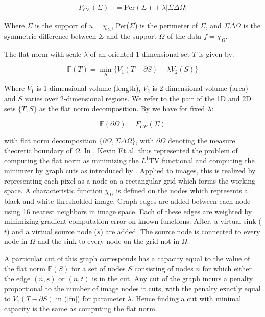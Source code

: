 \documentclass[12pt]{article}
\begin{document}
\begin{align*}
F_{CE}(\Sigma) &= \text{Per}(\Sigma) + \lambda|\Sigma \Delta \Omega|
\end{align*}

Where $\Sigma$ is the support of $u = \chi_\Sigma$, Per($\Sigma$) is the perimeter of $\Sigma$, and $\Sigma \Delta \Omega$ is the symmetric difference between $\Sigma$ and the support $\Omega$ of the data $f = \chi_\Omega$. 

The flat norm with scale $\lambda$ of an oriented $1$-dimensional set $T$ is given by:

\begin{equation} \label{fn}
\mathbb{F}(T) = \min_S \{V_1(T-\partial S) + \lambda V_2(S)\}
\end{equation}

Where $V_1$ is 1-dimensional volume (length), $V_2$ is 2-dimensional volume (area) and $S$ varies over $2$-dimensional regions. We refer to the pair of the 1D and 2D sets $\{T,S\}$ as the flat norm decomposition. By \cite{Morgan_2007} we have for fixed $\lambda$:

\begin{equation}
\mathbb{F}(\partial \Omega) = F_{CE}(\Sigma)
\end{equation}

with flat norm decomposition $\{\partial \Omega, \Sigma \Delta \Omega\}$, with $\partial \Omega$ denoting the measure theoretic boundary of $\Omega$. In \cite{shapes}, Kevin Et al. thus represented the problem of computing the flat norm as minimizing the $L^1$TV functional and computing the minimzer by graph cuts as introduced by \cite{kolmogorov}. Applied to images, this is realized by representing each pixel as a node on a rectangular grid which forms the working space. A characteristic function $\chi_\Omega$ is defined on the nodes which represents a black and white thresholded image. Graph edges are added between each node using 16 nearest neighbors in image space. Each of these edges are weighted by minimizing gradient computation error on known functions. After, a virtual sink ($t$) and a virtual source node ($s$) are added. The source node is connected to every node in $\Omega$ and the sink to every node on the grid not in $\Omega$. 

A particular cut of this graph corresponds has a capacity equal to the value of the flat norm $\mathbb{F}(S)$ for a set of nodes $S$ consisting of nodes $n$ for which either the edge $(n,s)$ or $(n,t)$ is in the cut. Any cut of the graph incurs a penalty proportional to the number of image nodes it cuts, with the penalty exactly equal to $V_1(T-\partial S)$ in (\ref{fn}) for parameter $\lambda$. Hence finding a cut with minimal capacity is the same as computing the flat norm. 
\end{document}
